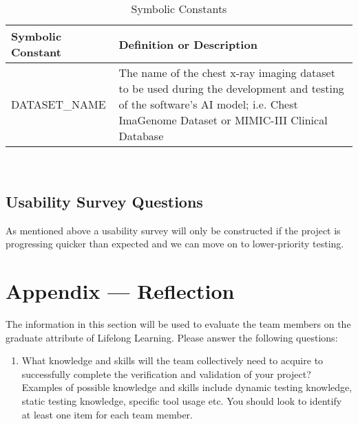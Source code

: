 \documentclass[12pt, titlepage]{article}
\begin{document}
\renewcommand{\arraystretch}{1.2}
\begin{table}[h]
    \centering
    \begin{tabular}{p{1.25in}p{3.75in}}
        \toprule
        \textbf{Symbolic Constant} & \textbf{Definition or Description} \\
        \midrule
        DATASET\_NAME & The name of the chest x-ray imaging dataset to be used during the development and testing of the software's AI model; i.e. Chest ImaGenome Dataset or MIMIC-III Clinical Database \\
        \bottomrule
    \end{tabular}\\
    \caption{Symbolic Constants}
    \label{tab:symbolicConstants}
\end{table}

\subsection{Usability Survey Questions}
\noindent As mentioned above a usability survey will only be constructed if the project is progressing quicker than expected and we can move on to lower-priority testing. 

\newpage{}
\section*{Appendix --- Reflection}

The information in this section will be used to evaluate the team members on the graduate attribute of Lifelong Learning. Please answer the following questions:
\begin{enumerate}[label=\arabic*., series=ar]
  \item What knowledge and skills will the team collectively need to acquire to
  successfully complete the verification and validation of your project?
  Examples of possible knowledge and skills include dynamic testing knowledge,
  static testing knowledge, specific tool usage etc. You should look to
  identify at least one item for each team member. \\
\end{enumerate}
\end{document}
